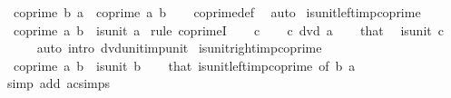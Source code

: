 \begin{isabellebody}
\ \ {\isachardoublequoteopen}coprime\ b\ a\ {\isasymlongleftrightarrow}\ coprime\ a\ b{\isachardoublequoteclose}\isanewline
%
\isadelimproof
\ \ %
\endisadelimproof
%
\isatagproof
{}\isamarkupfalse%
\ coprime{\isacharunderscore}{\kern0pt}def\ \isamarkupfalse%
\ auto%
\endisatagproof
{\isafoldproof}%
%
\isadelimproof
\isanewline
%
\endisadelimproof
\isanewline
{}\isamarkupfalse%
\ is{\isacharunderscore}{\kern0pt}unit{\isacharunderscore}{\kern0pt}left{\isacharunderscore}{\kern0pt}imp{\isacharunderscore}{\kern0pt}coprime{\isacharcolon}{\kern0pt}\isanewline
\ \ {\isachardoublequoteopen}coprime\ a\ b{\isachardoublequoteclose}\ \ {\isachardoublequoteopen}is{\isacharunderscore}{\kern0pt}unit\ a{\isachardoublequoteclose}\isanewline
%
\isadelimproof
%
\endisadelimproof
%
\isatagproof
{}\isamarkupfalse%
\ {\isacharparenleft}{\kern0pt}rule\ coprimeI{\isacharparenright}{\kern0pt}\isanewline
\ \ \isamarkupfalse%
\ c\isanewline
\ \ \isamarkupfalse%
\ {\isachardoublequoteopen}c\ dvd\ a{\isachardoublequoteclose}\isanewline
\ \ \isamarkupfalse%
\ that\ \isamarkupfalse%
\ {\isachardoublequoteopen}is{\isacharunderscore}{\kern0pt}unit\ c{\isachardoublequoteclose}\isanewline
\ \ \ \ \isamarkupfalse%
\ {\isacharparenleft}{\kern0pt}auto\ intro{\isacharcolon}{\kern0pt}\ dvd{\isacharunderscore}{\kern0pt}unit{\isacharunderscore}{\kern0pt}imp{\isacharunderscore}{\kern0pt}unit{\isacharparenright}{\kern0pt}\isanewline
{}\isamarkupfalse%
%
\endisatagproof
{\isafoldproof}%
%
\isadelimproof
\isanewline
%
\endisadelimproof
\isanewline
{}\isamarkupfalse%
\ is{\isacharunderscore}{\kern0pt}unit{\isacharunderscore}{\kern0pt}right{\isacharunderscore}{\kern0pt}imp{\isacharunderscore}{\kern0pt}coprime{\isacharcolon}{\kern0pt}\isanewline
\ \ {\isachardoublequoteopen}coprime\ a\ b{\isachardoublequoteclose}\ \ {\isachardoublequoteopen}is{\isacharunderscore}{\kern0pt}unit\ b{\isachardoublequoteclose}\isanewline
%
\isadelimproof
\ \ %
\endisadelimproof
%
\isatagproof
{}\isamarkupfalse%
\ that\ is{\isacharunderscore}{\kern0pt}unit{\isacharunderscore}{\kern0pt}left{\isacharunderscore}{\kern0pt}imp{\isacharunderscore}{\kern0pt}coprime\ {\isacharbrackleft}{\kern0pt}of\ b\ a{\isacharbrackright}{\kern0pt}\ \isamarkupfalse%
\ {\isacharparenleft}{\kern0pt}simp\ add{\isacharcolon}{\kern0pt}\ ac{\isacharunderscore}{\kern0pt}simps{\isacharparenright}{\kern0pt}%
\endisatagproof

\end{isabellebody}
